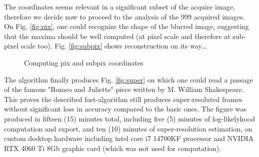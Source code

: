 \documentclass[10pt,letterpaper]{article}
\begin{document}
The coordinates seems relevant in a significant subset of the acquire image, therefore we decide now to proceed to the analysis of the 999 acquired images. On Fig. \ref{fig:pix}, one could recognize the shape of the blurred image, suggesting that the maxima should be well computed (at pixel scale and therefore at sub-pixel scale too). Fig. \ref{fig:subpix} shows reconstruction on its way\dots

\begin{figure}[h]
     \centering
     \caption{Computing pix and subpix coordinates}
\end{figure}

The algorithm finally produces Fig. \ref{fig:super} on which one could read a passage of the famous "Romeo and Juliette" piece written by M. William Shakespeare. This proves the described fast-algorithm still produces super-resoluted frames without significant loss in accuracy compared to the basic ones. The figure was produced in fifteen (15) minutes total, including five (5) minutes of log-likelyhood computation and export, and ten (10) minutes of super-resolution estimation, on custom desktop hardware including intel core i7 14700KF processor and NVIDIA RTX 4060 Ti 8Gb graphic card (which was not used for computation).
\end{document}
